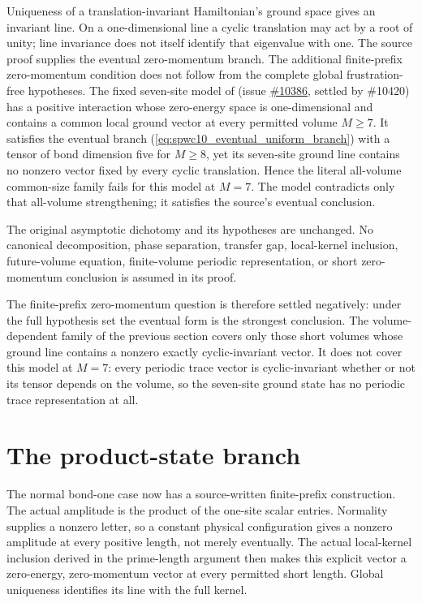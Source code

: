 \documentclass{article}
\begin{document}
Uniqueness of a translation-invariant Hamiltonian's ground space gives an
invariant line. On a one-dimensional line a cyclic translation may act by
a root of unity; line invariance does not itself identify that eigenvalue
with one. The source proof supplies the eventual zero-momentum branch. The
additional finite-prefix zero-momentum condition does not follow from the
complete global frustration-free hypotheses. The fixed seven-site model of
(issue \href{https://github.com/LionSR/TNLean/issues/10386}{\#10386},
settled by \#10420) has a positive interaction whose zero-energy space is
one-dimensional and contains a common local ground vector at every
permitted volume $M\ge7$. It satisfies the eventual branch
(\ref{eq:spwc10_eventual_uniform_branch}) with a tensor of bond dimension
five for $M\ge8$, yet its seven-site ground line contains no nonzero vector
fixed by every cyclic translation. Hence the literal all-volume
common-size family fails for this model at $M=7$. The model contradicts
only that all-volume strengthening; it satisfies the source's eventual
conclusion.

The original asymptotic dichotomy and its hypotheses are unchanged. No
canonical decomposition, phase separation, transfer gap, local-kernel
inclusion, future-volume equation, finite-volume periodic representation,
or short zero-momentum conclusion is assumed in its proof.

The finite-prefix zero-momentum question is therefore settled negatively:
under the full hypothesis set the eventual form is the strongest
conclusion. The volume-dependent family of the previous section covers
only those short volumes whose ground line contains a nonzero exactly
cyclic-invariant vector. It does not cover this model at $M=7$: every
periodic trace vector is cyclic-invariant whether or not its tensor
depends on the volume, so the seven-site ground state has no periodic
trace representation at all.

\section{The product-state branch}

The normal bond-one case now has a source-written finite-prefix
construction. The actual amplitude is the product of the one-site scalar
entries. Normality supplies a nonzero letter, so a constant physical
configuration gives a nonzero amplitude at every positive length, not
merely eventually. The actual local-kernel inclusion derived in the
prime-length argument then makes this explicit vector a zero-energy,
zero-momentum vector at every permitted short length. Global uniqueness
identifies its line with the full kernel.
\end{document}
